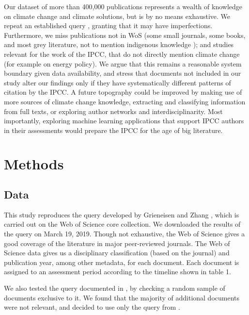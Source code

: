 \documentclass{article}
\begin{document}
\begin{linenumbers}
		Our dataset of more than 400,000 publications represents a wealth of knowledge on climate change and climate solutions, but is by no means exhaustive. We repeat an established query \cite{Haunschild2016}, granting that it may have imperfections. Furthermore, we miss publications not in WoS  (some small journals, some books, and most grey literature, not to mention indigenous knowledge \cite{Ford2016b}); and studies relevant for the work of the IPCC, that do not directly mention climate change (for example on energy policy). We argue that this remains a reasonable system boundary given data availability, and stress that documents not included in our study alter our findings only if they have systematically different patterns of citation by the IPCC. 
		A future topography could be improved by making use of more sources of climate change knowledge, extracting and classifying information from full texts, or exploring author networks and interdisciplinarity. 
		Most importantly, exploring machine learning applications that support IPCC authors in their assessments would prepare the IPCC for the age of big literature.
		
		\section*{Methods}
		
		\subsection*{Data}
		
		This study reproduces the query developed by Grieneisen and Zhang \cite{Grieneisen2011}, which is carried out on the Web of Science core collection. We downloaded the results of the query on March 19, 2019. Though not exhaustive, the Web of Science gives a good coverage of the literature in major peer-reviewed journals. The Web of Science data gives us a disciplinary classification (based on the journal) and publication year, among other metadata, for each document.	Each document is assigned to an assessment period according to the timeline shown in table 1.
		
		We also tested the query documented in \cite{Haunschild2016}, by checking a random sample of documents exclusive to it. We found that the majority of additional documents were not relevant, and decided to use only the query from \cite{Grieneisen2011}.
		

\end{linenumbers}
\end{document}
